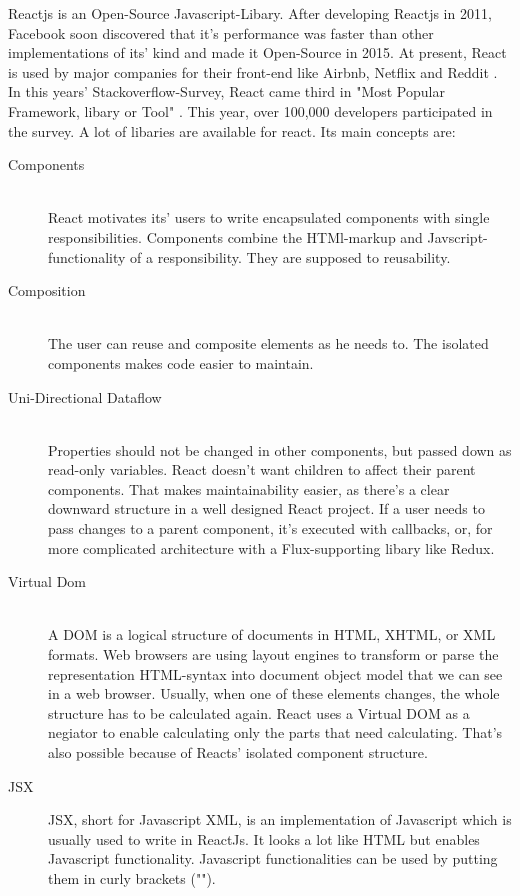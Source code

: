 Reactjs is an Open-Source Javascript-Libary.
After developing Reactjs in 2011, Facebook soon discovered that it's performance was faster than other implementations of its' kind and made it Open-Source in 2015. 
At present, React is used by major companies for their front-end like Airbnb, Netflix and Reddit \parencite{reactjsUsers}. 
In this years' Stackoverflow-Survey, React came third in "Most Popular Framework, libary or Tool" \parencite{stackOverflowSurvey}. 
This year, over 100,000 developers participated in the survey. 
A lot of libaries are available for react. 
Its main concepts are:
\begin{description}
    \item[Components] \hfill \\
    React motivates its' users to write encapsulated components with single responsibilities. Components combine the HTMl-markup and Javscript-functionality of a responsibility. They are supposed to reusability. %
    \item[Composition] \hfill \\
    The user can reuse and composite elements as he needs to. The isolated components makes code easier to maintain. 
    \item[Uni-Directional Dataflow] \hfill \\
            Properties should not be changed in other components, but passed down as read-only variables. 
            React doesn't want children to affect their parent components. That makes maintainability easier, as there's a clear downward structure in a well designed React project.
            If a user needs to pass changes to a parent component, it's executed with callbacks, or, for more complicated architecture with a Flux-supporting libary like Redux.
    \item[Virtual Dom]\hfill \\
    A DOM%
    is a logical structure of documents in HTML, XHTML, or XML formats. 
    Web browsers are using layout engines to transform or parse the representation HTML-syntax into document object model that we can see in a web browser.
    Usually, when one of these elements changes, the whole structure has to be calculated again. 
    React uses a Virtual DOM as a negiator to enable calculating only the parts that need calculating. That's also possible because of Reacts' isolated component structure.
    \item[JSX]  JSX, short for Javascript XML, is an implementation of Javascript which is usually used to write in ReactJs. 
    It looks a lot like HTML but enables Javascript functionality. Javascript functionalities can be used by putting them in curly brackets ("{}").
\end{description}


